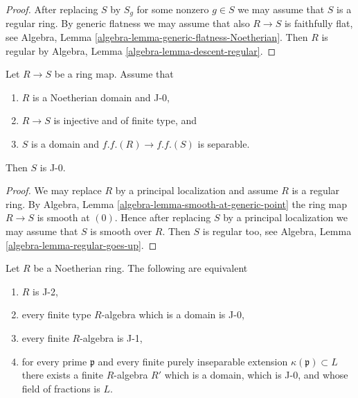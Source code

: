 \begin{proof}
After replacing $S$ by $S_g$ for some nonzero $g \in S$ we may assume
that $S$ is a regular ring. By generic flatness we may assume that also
$R \to S$ is faithfully flat, see
Algebra, Lemma \ref{algebra-lemma-generic-flatness-Noetherian}.
Then $R$ is regular by
Algebra, Lemma \ref{algebra-lemma-descent-regular}.
\end{proof}

\begin{lemma}
\label{lemma-J-0-goes-up}
Let $R \to S$ be a ring map. Assume that
\begin{enumerate}
\item $R$ is a Noetherian domain and J-0,
\item $R \to S$ is injective and of finite type, and
\item $S$ is a domain and $f.f.(R) \to f.f.(S)$ is separable.
\end{enumerate}
Then $S$ is J-0.
\end{lemma}

\begin{proof}
We may replace $R$ by a principal localization and assume $R$ is
a regular ring. By Algebra, Lemma \ref{algebra-lemma-smooth-at-generic-point}
the ring map $R \to S$ is smooth at $(0)$.
Hence after replacing $S$ by a principal localization
we may assume that $S$ is smooth over $R$.
Then $S$ is regular too, see
Algebra, Lemma \ref{algebra-lemma-regular-goes-up}.
\end{proof}

\begin{lemma}
\label{lemma-J-2}
Let $R$ be a Noetherian ring. The following are equivalent
\begin{enumerate}
\item $R$ is J-2,
\item every finite type $R$-algebra which is a domain is J-0,
\item every finite $R$-algebra is J-1,
\item for every prime $\mathfrak p$ and every finite purely inseparable
extension $\kappa(\mathfrak p) \subset L$ there exists a finite
$R$-algebra $R'$ which is a domain, which is J-0, and whose field
of fractions is $L$.
\end{enumerate}
\end{lemma}

